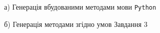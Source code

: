 \documentclass[a4paper,14pt]{extarticle} %
\numberwithin{equation}{section}
\begin{document}
\begin{figure}[H]
    \begin{minipage}[H]{0.49\linewidth}
        а) Генерація вбудованими методами мови \texttt{Python}
    \end{minipage}
    \hfill
    \begin{minipage}[H]{0.49\linewidth}
        б) Генерація методами згідно умов Завдання 3
    \end{minipage}
\end{figure}
\end{document}
